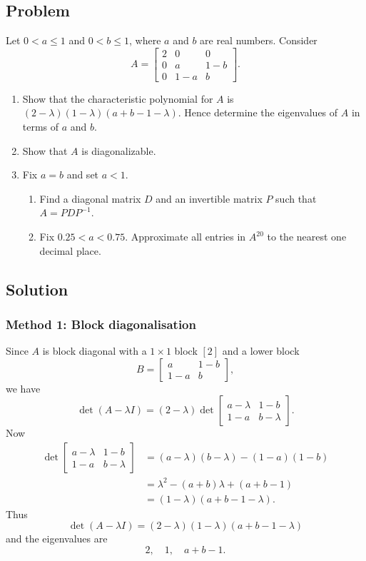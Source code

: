 \documentclass[12pt]{article}
\begin{document}
\subsection{Problem}
Let $0<a\le1$ and $0<b\le1$, where $a$ and $b$ are real numbers. Consider
\[
A=\begin{bmatrix}
2&0&0\\
0&a&1-b\\
0&1-a&b
\end{bmatrix}.
\]
\begin{enumerate}[label=(\alph*)]
  \item Show that the characteristic polynomial for $A$ is $(2-\lambda)(1-\lambda)(a+b-1-\lambda)$. Hence determine the eigenvalues of $A$ in terms of $a$ and $b$.
  \item Show that $A$ is diagonalizable.
  \item Fix $a=b$ and set $a<1$.
  \begin{enumerate}[label=(\roman*)]
    \item Find a diagonal matrix $D$ and an invertible matrix $P$ such that $A=PDP^{-1}$.
    \item Fix $0.25<a<0.75$. Approximate all entries in $A^{20}$ to the nearest one decimal place.
  \end{enumerate}
\end{enumerate}

\subsection{Solution}

\subsubsection{Method 1: Block diagonalisation}
Since $A$ is block diagonal with a $1\times1$ block $[2]$ and a lower block
\[
B=\begin{bmatrix}a&1-b\\1-a&b\end{bmatrix},
\]
we have
\[
\det(A-\lambda I)=(2-\lambda)\det\begin{bmatrix}a-\lambda&1-b\\1-a&b-\lambda\end{bmatrix}.
\]
Now
\begin{align*}
\det\begin{bmatrix}a-\lambda&1-b\\1-a&b-\lambda\end{bmatrix}
&=(a-\lambda)(b-\lambda)-(1-a)(1-b)\\
&=\lambda^2-(a+b)\lambda+(a+b-1)\\
&=(1-\lambda)(a+b-1-\lambda).
\end{align*}
Thus
\[
\boxed{\det(A-\lambda I)=(2-\lambda)(1-\lambda)(a+b-1-\lambda)}
\]
and the eigenvalues are
\[
\boxed{2,
\quad 1,
\quad a+b-1.}
\]
\end{document}
